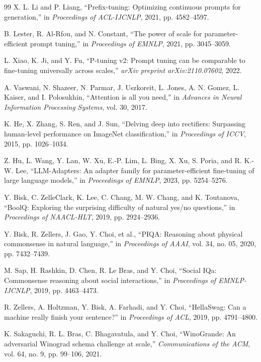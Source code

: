 \documentclass[UTF8,a4paper,11pt]{ctexart}
\begin{document}
\begin{thebibliography}{99}
X. L. Li and P. Liang, ``Prefix-tuning: Optimizing continuous prompts for generation,'' in \emph{Proceedings of ACL-IJCNLP}, 2021, pp. 4582--4597.

B. Lester, R. Al-Rfou, and N. Constant, ``The power of scale for parameter-efficient prompt tuning,'' in \emph{Proceedings of EMNLP}, 2021, pp. 3045--3059.

L. Xiao, K. Ji, and Y. Fu, ``P-tuning v2: Prompt tuning can be comparable to fine-tuning universally across scales,'' \emph{arXiv preprint arXiv:2110.07602}, 2022.

A. Vaswani, N. Shazeer, N. Parmar, J. Uszkoreit, L. Jones, A. N. Gomez, L. Kaiser, and I. Polosukhin, ``Attention is all you need,'' in \emph{Advances in Neural Information Processing Systems}, vol. 30, 2017.

K. He, X. Zhang, S. Ren, and J. Sun, ``Delving deep into rectifiers: Surpassing human-level performance on ImageNet classification,'' in \emph{Proceedings of ICCV}, 2015, pp. 1026--1034.

Z. Hu, L. Wang, Y. Lan, W. Xu, E.-P. Lim, L. Bing, X. Xu, S. Poria, and R. K.-W. Lee, ``LLM-Adapters: An adapter family for parameter-efficient fine-tuning of large language models,'' in \emph{Proceedings of EMNLP}, 2023, pp. 5254--5276.

Y. Bisk, C. ZelleClark, K. Lee, C. Chang, M. W. Chang, and K. Toutanova, ``BoolQ: Exploring the surprising difficulty of natural yes/no questions,'' in \emph{Proceedings of NAACL-HLT}, 2019, pp. 2924--2936.

Y. Bisk, R. Zellers, J. Gao, Y. Choi, et al., ``PIQA: Reasoning about physical commonsense in natural language,'' in \emph{Proceedings of AAAI}, vol. 34, no. 05, 2020, pp. 7432--7439.

M. Sap, H. Rashkin, D. Chen, R. Le Bras, and Y. Choi, ``Social IQa: Commonsense reasoning about social interactions,'' in \emph{Proceedings of EMNLP-IJCNLP}, 2019, pp. 4463--4473.

R. Zellers, A. Holtzman, Y. Bisk, A. Farhadi, and Y. Choi, ``HellaSwag: Can a machine really finish your sentence?'' in \emph{Proceedings of ACL}, 2019, pp. 4791--4800.

K. Sakaguchi, R. L. Bras, C. Bhagavatula, and Y. Choi, ``WinoGrande: An adversarial Winograd schema challenge at scale,'' \emph{Communications of the ACM}, vol. 64, no. 9, pp. 99--106, 2021.


\end{thebibliography}
\end{document}
